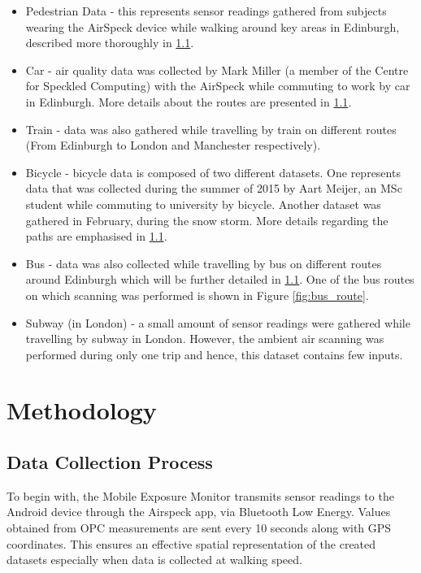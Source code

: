 \documentclass[bsc,frontabs,twoside,singlespacing,parskip,deptreport]{infthesis}     %
\begin{document}
\begin{itemize}

\item Pedestrian Data - this represents sensor readings gathered from subjects wearing the AirSpeck device while walking around key areas in Edinburgh, described more thoroughly in \ref{sec:data-collection}.

\item Car - air quality data was collected by Mark Miller (a member of the Centre for Speckled Computing) with the AirSpeck while commuting to work by car in Edinburgh. More details about the routes are presented in \ref{sec:data-collection}.

\item Train - data was also gathered while travelling by train on different routes (From Edinburgh to London and Manchester respectively).

\item Bicycle - bicycle data is composed of two different datasets. One represents data that was collected during the summer of 2015 by Aart Meijer, an MSc student while commuting to university by bicycle. Another dataset was gathered in February, during the snow storm. More details regarding the paths are emphasised in \ref{sec:data-collection}.

\item Bus - data was also collected while travelling by bus on different routes around Edinburgh which will be further detailed in \ref{sec:data-collection}. One of the bus routes on which scanning was performed is shown in Figure \ref{fig:bus_route}.

\item Subway (in London) - a small amount of sensor readings were gathered while travelling by subway in London. However, the ambient air scanning was performed during only one trip and hence, this dataset contains few inputs.
\end{itemize}

\chapter{Methodology}

\section{Data Collection Process}
\label{sec:data-collection}

To begin with, the Mobile Exposure Monitor transmits sensor readings to the Android device through the Airspeck app, via Bluetooth Low Energy. Values obtained from OPC measurements are sent every 10 seconds along with GPS coordinates. This ensures an effective spatial representation of the created datasets especially when data is collected at walking speed.
\end{document}
